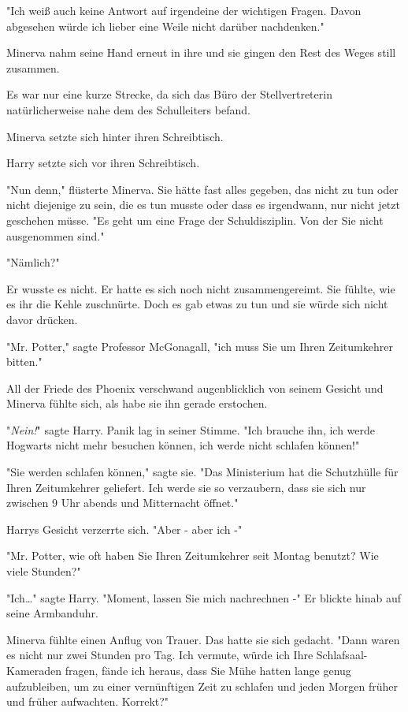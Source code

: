 {"Ich weiß auch keine Antwort auf irgendeine der wichtigen Fragen. Davon abgesehen würde ich lieber eine Weile nicht darüber nachdenken."

Minerva nahm seine Hand erneut in ihre und sie gingen den Rest des Weges still zusammen.

Es war nur eine kurze Strecke, da sich das Büro der Stellvertreterin natürlicherweise nahe dem des Schulleiters befand.

Minerva setzte sich hinter ihren Schreibtisch.

Harry setzte sich vor ihren Schreibtisch.

"Nun denn," flüsterte Minerva. Sie hätte fast alles gegeben, das nicht zu tun oder nicht diejenige zu sein, die es tun musste oder dass es irgendwann, nur nicht jetzt geschehen müsse. "Es geht um eine Frage der Schuldisziplin. Von der Sie nicht ausgenommen sind."

"Nämlich?"

Er wusste es nicht. Er hatte es sich noch nicht zusammengereimt. Sie fühlte, wie es ihr die Kehle zuschnürte. Doch es gab etwas zu tun und sie würde sich nicht davor drücken.

"Mr. Potter," sagte Professor McGonagall, "ich muss Sie um Ihren Zeitumkehrer bitten."

All der Friede des Phoenix verschwand augenblicklich von seinem Gesicht und Minerva fühlte sich, als habe sie ihn gerade erstochen.

"\emph{Nein!}" sagte Harry. Panik lag in seiner Stimme. "Ich brauche ihn, ich werde Hogwarts nicht mehr besuchen können, ich werde nicht schlafen können!"

"Sie werden schlafen können," sagte sie. "Das Ministerium hat die Schutzhülle für Ihren Zeitumkehrer geliefert. Ich werde sie so verzaubern, dass sie sich nur zwischen 9 Uhr abends und Mitternacht öffnet."

Harrys Gesicht verzerrte sich. "Aber - aber ich -"

"Mr. Potter, wie oft haben Sie Ihren Zeitumkehrer seit Montag benutzt? Wie viele Stunden?"

"Ich…" sagte Harry. "Moment, lassen Sie mich nachrechnen -" Er blickte hinab auf seine Armbanduhr.

Minerva fühlte einen Anflug von Trauer. Das hatte sie sich gedacht. "Dann waren es nicht nur zwei Stunden pro Tag. Ich vermute, würde ich Ihre Schlafsaal-Kameraden fragen, fände ich heraus, dass Sie Mühe hatten lange genug aufzubleiben, um zu einer vernünftigen Zeit zu schlafen und jeden Morgen früher und früher aufwachten. Korrekt?"

}
